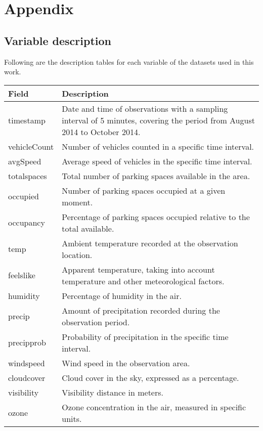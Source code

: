 \chapter{Appendix}
\label{app:a}

\section{Variable description}
Following are the description tables for each variable of the datasets used in this work.

\begin{table}[ht]
   
    \centering
    \begin{tabular}{|p{3cm}|p{9cm}|}
        \hline
        \textbf{Field} & \textbf{Description} \\
        \hline
        timestamp & Date and time of observations with a sampling interval of 5 minutes, covering the period from August 2014 to October 2014. \\
        vehicleCount & Number of vehicles counted in a specific time interval. \\ 
        avgSpeed & Average speed of vehicles in the specific time interval. \\ 
        totalspaces & Total number of parking spaces available in the area. \\ 
        occupied & Number of parking spaces occupied at a given moment. \\ 
        occupancy & Percentage of parking spaces occupied relative to the total available. \\ 
        temp & Ambient temperature recorded at the observation location. \\ 
        feelslike & Apparent temperature, taking into account temperature and other meteorological factors. \\ 
        humidity & Percentage of humidity in the air. \\ 
        precip & Amount of precipitation recorded during the observation period. \\ 
        precipprob & Probability of precipitation in the specific time interval. \\ 
        windspeed & Wind speed in the observation area. \\ 
        cloudcover & Cloud cover in the sky, expressed as a percentage. \\ 
        visibility & Visibility distance in meters. \\ 
        ozone & Ozone concentration in the air, measured in specific units. \\ 

\end{tabular}
\end{table}

